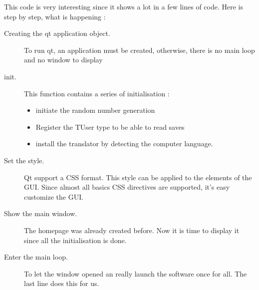 This code is very interesting since it shows a lot in a few lines of code. Here is step by step, what is happening :
\begin{description}
	\item[Creating the qt application object.] To run qt, an application must be created, otherwise, there is no main loop and no window to display
	\item[init.]  This function contains a series of initialisation :
	\begin{itemize}
		\item initiate the random number generation
		\item Register the TUser type to be able to read saves 
		\item install the translator by detecting the computer language.
	\end{itemize}
	\item[Set the style.] Qt support a CSS format. This style can be applied to the elements of the GUI. Since almost all basics CSS directives are supported, it's easy customize the GUI.
	\item[Show the main window.] The homepage was already created before. Now  it is time to display it since all the initialisation is done.
	\item[Enter the main loop.] To let the window opened an really launch the software once for all. The last line does this for us.
\end{description}


